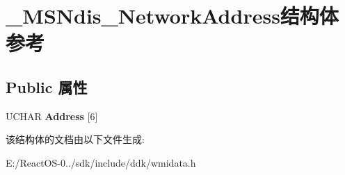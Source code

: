\hypertarget{struct___m_s_ndis___network_address}{}\section{\+\_\+\+M\+S\+Ndis\+\_\+\+Network\+Address结构体 参考}
\label{struct___m_s_ndis___network_address}
\subsection*{Public 属性}
\begin{DoxyCompactItemize}
\item 
\mbox{\label{struct___m_s_ndis___network_address_aa3c66ae714288cd5c1804a125a34ba5e}} 
U\+C\+H\+AR {\bfseries Address} \mbox{[}6\mbox{]}
\end{DoxyCompactItemize}


该结构体的文档由以下文件生成\+:\begin{DoxyCompactItemize}
\item 
E\+:/\+React\+O\+S-\/0../sdk/include/ddk/wmidata.\+h\end{DoxyCompactItemize}

